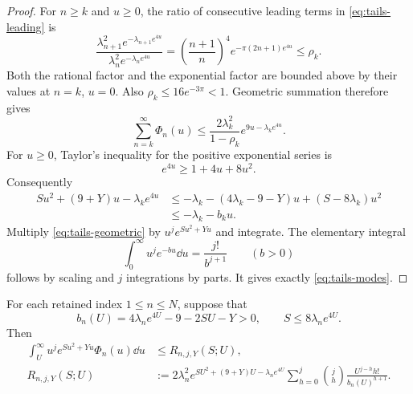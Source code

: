 \begin{proof}
For $n\ge k$ and $u\ge0$, the ratio of consecutive leading terms in
\eqref{eq:tails-leading} is
\[
 \frac{\lambda_{n+1}^2e^{-\lambda_{n+1}e^{4u}}}
      {\lambda_n^2e^{-\lambda_ne^{4u}}}
 =\left(\frac{n+1}{n}\right)^4
                 e^{-\pi(2n+1)e^{4u}}
 \le\rho_k.
\]
Both the rational factor and the exponential factor are bounded above
by their values at $n=k$, $u=0$. Also
$\rho_k\le16e^{-3\pi}<1$. Geometric summation therefore gives
\begin{equation}\label{eq:tails-geometric}
 \sum_{n=k}^\infty\Phi_n(u)
 \le\frac{2\lambda_k^2}{1-\rho_k}
                 e^{9u-\lambda_ke^{4u}}.
\end{equation}
For $u\ge0$, Taylor's inequality for the positive exponential series is
\begin{equation}\label{eq:tails-exp-inequality}
 e^{4u}\ge1+4u+8u^2.
\end{equation}
Consequently
\begin{align*}
 Su^2+(9+Y)u-\lambda_ke^{4u}
 &\le-\lambda_k-(4\lambda_k-9-Y)u
                         +(S-8\lambda_k)u^2\\
 &\le-\lambda_k-b_ku.
\end{align*}
Multiply \eqref{eq:tails-geometric} by $u^je^{Su^2+Yu}$ and
integrate. The elementary integral
\[
 \int_0^\infty u^je^{-bu}\dd u=\frac{j!}{b^{j+1}}
 \qquad(b>0)
\]
follows by scaling and $j$ integrations by parts. It gives exactly
\eqref{eq:tails-modes}.
\end{proof}

\begin{proposition}\label{prop:tails-rays}
For each retained index $1\le n\le N$, suppose that
\begin{equation}\label{eq:tails-ray-parameters}
 b_n(U)=4\lambda_ne^{4U}-9-2SU-Y>0,
 \qquad S\le8\lambda_ne^{4U}.
\end{equation}
Then
\begin{align}
 \int_U^\infty u^je^{Su^2+Yu}\Phi_n(u)\dd u
 &\le R_{n,j,Y}(S;U),\label{eq:tails-ray-bound}\\
 R_{n,j,Y}(S;U)
 &:={2\lambda_n^2}
 e^{SU^2+(9+Y)U-\lambda_ne^{4U}}
 \sum_{h=0}^{j}\binom{j}{h}
       \frac{U^{j-h}h!}{b_n(U)^{h+1}}.
 \label{eq:tails-ray}
\end{align}
\end{proposition}

